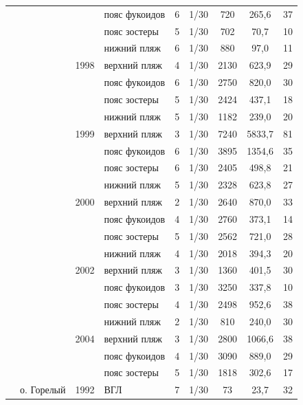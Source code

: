 \documentclass[12pt, a4paper]{disser}
\begin{document}
\begin{footnotesize}
\begin{longtable}{|p{2cm}|p{3cm}|p{1cm}|p{2cm}|p{1.5cm}|p{1cm}|*{3}{c|}}
		\\ \cline{4-9}
		 &  &  & пояс фукоидов & 6 & 1/30 & 720 & 265,6 & 37
		\\ \cline{4-9}
		 &  &  & пояс зостеры & 5 & 1/30 & 702 & 70,7 & 10
		\\ \cline{4-9}
		 &  &  & нижний пляж & 6 & 1/30 & 880 & 97,0 & 11
		\\ \cline{3-9}
		 &  & 1998 & верхний пляж & 4 & 1/30 & 2130 & 623,9 & 29
		\\ \cline{4-9}
		 &  &  & пояс фукоидов & 6 & 1/30 & 2750 & 820,0 & 30
		\\ \cline{4-9}
		 &  &  & пояс зостеры & 5 & 1/30 & 2424 & 437,1 & 18
		\\ \cline{4-9}
		 &  &  & нижний пляж & 5 & 1/30 & 1182 & 239,0 & 20
		\\ \cline{3-9}
		 &  & 1999 & верхний пляж & 3 & 1/30 & 7240 & 5833,7 & 81
		\\ \cline{4-9}
		 &  &  & пояс фукоидов & 6 & 1/30 & 3895 & 1354,6 & 35
		\\ \cline{4-9}
		 &  &  & пояс зостеры & 6 & 1/30 & 2405 & 498,8 & 21
		\\ \cline{4-9}
		 &  &  & нижний пляж & 5 & 1/30 & 2328 & 623,8 & 27
		\\ \cline{3-9}
		 &  & 2000 & верхний пляж & 2 & 1/30 & 2640 & 870,0 & 33
		\\ \cline{4-9}
		 &  &  & пояс фукоидов & 4 & 1/30 & 2760 & 373,1 & 14
		\\ \cline{4-9}
		 &  & & пояс зостеры & 5 & 1/30 & 2562 & 721,0 & 28
		\\ \cline{4-9}
		 &  &  & нижний пляж & 4 & 1/30 & 2018 & 394,3 & 20
		\\ \cline{3-9}
		 &  & 2002 & верхний пляж & 3 & 1/30 & 1360 & 401,5 & 30
		\\ \cline{4-9}
		 &  &  & пояс фукоидов & 3 & 1/30 & 3250 & 337,8 & 10
		\\ \cline{4-9}
		 &  &  & пояс зостеры & 4 & 1/30 & 2498 & 952,6 & 38
		\\ \cline{4-9}
		 &  &  & нижний пляж & 2 & 1/30 & 810 & 240,0 & 30
		\\ \cline{3-9}
		 &  & 2004 & верхний пляж & 3 & 1/30 & 2800 & 1066,6 & 38
		\\ \cline{4-9}
		 &  &  & пояс фукоидов & 4 & 1/30 & 3090 & 889,0 & 29
		\\ \cline{4-9}
		 &  &  & пояс зостеры & 5 & 1/30 & 1818 & 302,6 & 17
		\\ \cline{2-9}
		 & о. Горелый & 1992 & ВГЛ & 7 & 1/30 & 73 & 23,7 & 32
		\\ \cline{4-9}

\end{longtable}
\end{footnotesize}
\end{document}
